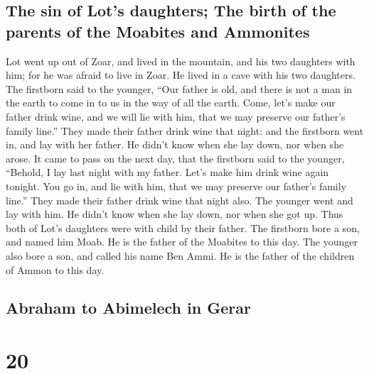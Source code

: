 \hypertarget{the-sin-of-lots-daughters-the-birth-of-the-parents-of-the-moabites-and-ammonites}{%
\subsection{The sin of Lot's daughters; The birth of the parents of the
Moabites and
Ammonites}\label{the-sin-of-lots-daughters-the-birth-of-the-parents-of-the-moabites-and-ammonites}}

 Lot went up out of Zoar, and lived in the mountain, and
his two daughters with him; for he was afraid to live in Zoar. He lived
in a cave with his two daughters.  The firstborn said to
the younger, ``Our father is old, and there is not a man in the earth to
come in to us in the way of all the earth.  Come, let's
make our father drink wine, and we will lie with him, that we may
preserve our father's family line.''  They made their
father drink wine that night: and the firstborn went in, and lay with
her father. He didn't know when she lay down, nor when she arose.
 It came to pass on the next day, that the firstborn said
to the younger, ``Behold, I lay last night with my father. Let's make
him drink wine again tonight. You go in, and lie with him, that we may
preserve our father's family line.''  They made their
father drink wine that night also. The younger went and lay with him. He
didn't know when she lay down, nor when she got up.  Thus
both of Lot's daughters were with child by their father. 
The firstborn bore a son, and named him Moab. He is the father of the
Moabites to this day.  The younger also bore a son, and
called his name Ben Ammi. He is the father of the children of Ammon to
this day.

\hypertarget{abraham-to-abimelech-in-gerar}{%
\subsection{Abraham to Abimelech in
Gerar}\label{abraham-to-abimelech-in-gerar}}

\hypertarget{section-19}{%
\section{20}\label{section-19}}

